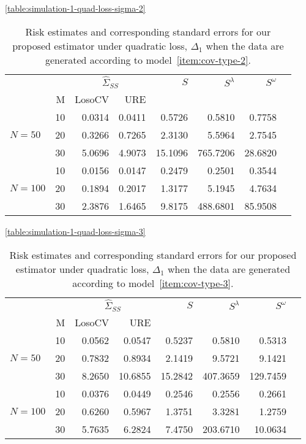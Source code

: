 \documentclass[12pt]{article}
\theoremstyle{definition}
\begin{document}
\begin{table}[H]\ref{table:simulation-1-quad-loss-sigma-2}
\centering
\caption{Risk estimates and corresponding standard errors for our proposed estimator under quadratic loss, $\Delta_1$ when the data are generated according to model~\ref{item:cov-type-2}.} 
\begin{tabular}{l|r|rrrrrr}
&  & \multicolumn{2}{c}{$\hat{\Sigma}_{SS}$} & $S$ & $S^\lambda$ & $S^\omega$ \\ 
&M & \mbox{LosoCV} & \mbox{URE} &  \\ 
  \hline
&    10 & 0.0314 &  0.0411	&0.5726  & 0.5810 & 0.7758\\ 
$N = 50 $ &    20 & 0.3266 & 0.7265	& 2.3130   & 5.5964 & 2.7545  \\ 
 &    30 & 5.0696 &  4.9073	 &15.1096 & 765.7206 & 28.6820  \\ \hdashline
 &    10 & 0.0156 &  0.0147	& 0.2479  & 0.2501 & 0.3544 \\ 
$N = 100$ &    20 & 0.1894 &  0.2017	 &1.3177 & 5.1945 & 4.7634 \\ 
  &    30 & 2.3876 &	1.6465  & 9.8175 & 488.6801 & 85.9508\\ 
\end{tabular}
\end{table}


\begin{table}[H]\ref{table:simulation-1-quad-loss-sigma-3}
\centering
\caption{Risk estimates and corresponding standard errors for our proposed estimator under quadratic loss, $\Delta_1$ when the data are generated according to model~\ref{item:cov-type-3}.} 
\begin{tabular}{l|r|rrrrrr}
&  & \multicolumn{2}{c}{$\hat{\Sigma}_{SS}$} & $S$ & $S^\lambda$ & $S^\omega$ \\ 
&M & \mbox{LosoCV} & \mbox{URE} &  \\ 
  \hline
 	          &    10 & 0.0562 &	0.0547 & 0.5237 & 0.5810 & 0.5313 \\ 
 $N = 50$ 	 &     20 & 0.7832 & 0.8934   & 2.1419 & 9.5721 & 9.1421\\ 
  		  &    30 & 8.2650 & 10.6855  & 15.2842 & 407.3659 & 129.7459\\ \hdashline
		  &    10 & 0.0376 &0.0449	 & 0.2546  & 0.2556 & 0.2661\\ 
 $N = 100$  &    20 & 0.6260 & 0.5967	 & 1.3751 & 3.3281 & 1.2759\\ 
   &    30 & 5.7635 &	6.2824 & 7.4750& 203.6710 & 10.0634 \\ 
\end{tabular}
\end{table}
\end{document}
